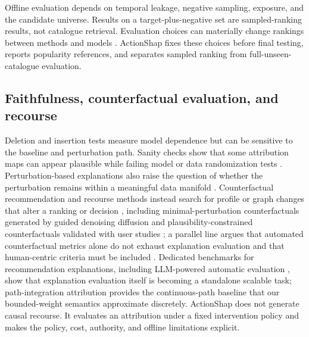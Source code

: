\documentclass[pdflatex,sn-mathphys-num]{sn-jnl}
\theoremstyle{thmstyleone}
\theoremstyle{thmstyletwo}
\theoremstyle{thmstylethree}
\begin{document}
Offline evaluation depends on temporal leakage, negative sampling, exposure, and the candidate universe. Results on a target-plus-negative set are sampled-ranking results, not catalogue retrieval. Evaluation choices can materially change rankings between methods and models \cite{harper2016,bennett2007,saito2021}. ActionShap fixes these choices before final testing, reports popularity references, and separates sampled ranking from full-unseen-catalogue evaluation.
\FloatBarrier

\subsection{Faithfulness, counterfactual evaluation, and recourse}
Deletion and insertion tests measure model dependence but can be sensitive to the baseline and perturbation path. Sanity checks show that some attribution maps can appear plausible while failing model or data randomization tests \cite{adebayo2018}. Perturbation-based explanations also raise the question of whether the perturbation remains within a meaningful data manifold \cite{hooker2019}. Counterfactual recommendation and recourse methods instead search for profile or graph changes that alter a ranking or decision \cite{ghazimatin2020,tran2021,tan2021,yao2022,baklanov2024,barkan2024,gurevitch2025,mohammadi2025,nguyen2026,wachter2017,karimi2021}, including minimal-perturbation counterfactuals generated by guided denoising diffusion \cite{mohammadi2026sigir} and plausibility-constrained counterfactuals validated with user studies \cite{cerny2025plausible}; a parallel line argues that automated counterfactual metrics alone do not exhaust explanation evaluation and that human-centric criteria must be included \cite{domnich2025unifying}. Dedicated benchmarks for recommendation explanations, including LLM-powered automatic evaluation \cite{li2025alert}, show that explanation evaluation itself is becoming a standalone scalable task; path-integration attribution \cite{sundararajan2017axiomatic} provides the continuous-path baseline that our bounded-weight semantics approximate discretely. ActionShap does not generate causal recourse. It evaluates an attribution under a fixed intervention policy and makes the policy, cost, authority, and offline limitations explicit.
\end{document}
